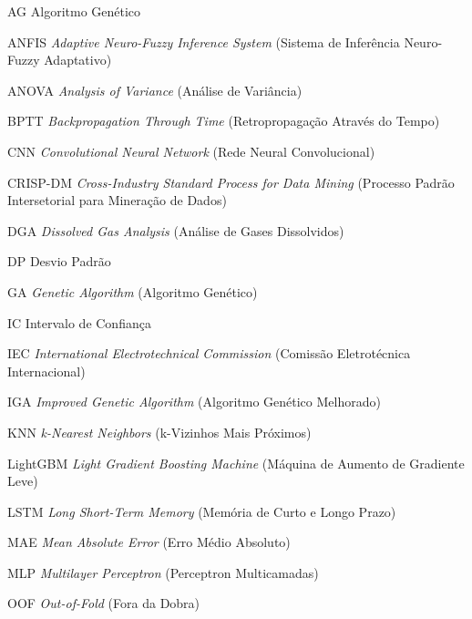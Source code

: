 \listoffigures*
\cleardoublepage


\listoftables*
\cleardoublepage

\begin{siglas}
  \item[AG] Algoritmo Genético
  \item[ANFIS] \textit{Adaptive Neuro-Fuzzy Inference System} (Sistema de Inferência Neuro-Fuzzy Adaptativo)
  \item[ANOVA] \textit{Analysis of Variance} (Análise de Variância)
  \item[BPTT] \textit{Backpropagation Through Time} (Retropropagação Através do Tempo)
  \item[CNN] \textit{Convolutional Neural Network} (Rede Neural Convolucional)
  \item[CRISP-DM] \textit{Cross-Industry Standard Process for Data Mining} (Processo Padrão Intersetorial para Mineração de Dados)
  \item[DGA] \textit{Dissolved Gas Analysis} (Análise de Gases Dissolvidos)
  \item[DP] Desvio Padrão
  \item[GA] \textit{Genetic Algorithm} (Algoritmo Genético)
  \item[IC] Intervalo de Confiança
  \item[IEC] \textit{International Electrotechnical Commission} (Comissão Eletrotécnica Internacional)
  \item[IGA] \textit{Improved Genetic Algorithm} (Algoritmo Genético Melhorado)
  \item[KNN] \textit{k-Nearest Neighbors} (k-Vizinhos Mais Próximos)
  \item[LightGBM] \textit{Light Gradient Boosting Machine} (Máquina de Aumento de Gradiente Leve)
  \item[LSTM] \textit{Long Short-Term Memory} (Memória de Curto e Longo Prazo)
  \item[MAE] \textit{Mean Absolute Error} (Erro Médio Absoluto)
  \item[MLP] \textit{Multilayer Perceptron} (Perceptron Multicamadas)
  \item[OOF] \textit{Out-of-Fold} (Fora da Dobra)

\end{siglas}
